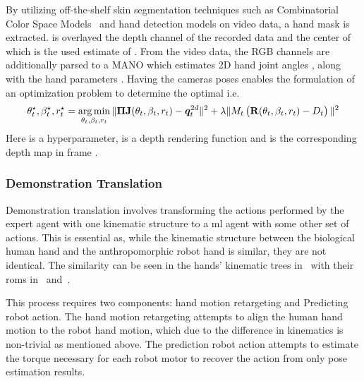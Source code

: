 By utilizing off-the-shelf skin segmentation techniques such as Combinatorial Color Space Models~\cite{combinatorial-color-space-models-for-skin-detection-in-sub-continental-human-images} and hand detection models on video data, a hand mask  is extracted.  is overlayed the depth channel of the recorded data and the center of which is the used estimate of . From the video data, the RGB channels are additionally parsed to a MANO which estimates 2D hand joint angles , along with the hand parameters . Having the cameras poses \mat{\Pi} enables the formulation of an optimization problem to determine the optimal  i.e. 
%
\begin{equation}
    \theta_t^\star,\beta_t^\star, r_t^\star = \operatorname*{arg\,min}_{\theta_t,\beta_t,r_t} \| \bm{\mathrm{\Pi}} \bm{\mathrm{J}}(\theta_t,\beta_t, r_t) - \bm{q}_t^{2d} \|^2 + \lambda\| M_t \left( \bm{\mathrm{R}}(\theta_t,\beta_t,r_t) - D_t \right) \|^2
\end{equation}
Here  is a hyperparameter,  is a depth rendering function and  is the corresponding depth map in frame .

\subsubsection{Demonstration Translation}

Demonstration translation involves transforming the actions performed by the expert agent with one kinematic structure to a \gls{ml} agent with some other set of actions. This is essential as, while the kinematic structure between the biological human hand and the anthropomorphic robot hand is similar, they are not identical. The similarity can be seen in the hands' kinematic trees in~ with their \gls{rom}s in~ and~.\medskip

This process requires two components: hand motion retargeting and Predicting
robot action. The hand motion retargeting attempts to align the human hand motion to the
robot hand motion, which due to the difference in kinematics is non-trivial as mentioned above. The prediction robot action attempts to estimate the torque necessary for each robot motor to recover the action from only pose estimation results. \medskip

